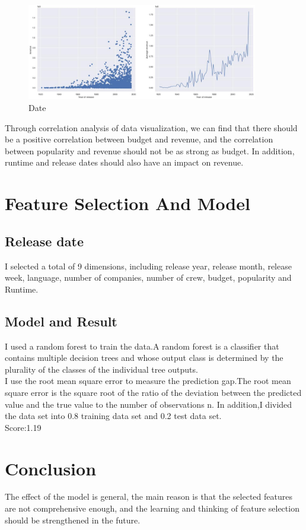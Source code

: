\begin{figure}[htbp]
  \includegraphics[width=0.9\textwidth,height=0.5\textwidth]{./figures/year2.eps}
  \caption{Date}
\end{figure}

Through correlation analysis of data visualization, we can find that there should be a positive correlation 
between budget and revenue, and the correlation between popularity and revenue should not be as strong as budget.
In addition, runtime and release dates should also have an impact on revenue.  \\


\section{Feature Selection And Model} \label{sec-preliminaries}
\subsection{Release date}
I selected a total of 9 dimensions, including release year, release month, release week, language, number of companies, 
number of crew, budget, popularity and Runtime.  \\

\subsection{Model and Result}
I used a random forest to train the data.A random forest is a classifier that contains multiple decision trees and whose output class is
determined by the plurality of the classes of the individual tree outputs.  \\
I use the root mean square error to measure the prediction gap.The root mean square error is the square root of the ratio of the deviation between the predicted
value and the true value to the number of observations n. In addition,I divided the data set into 0.8 training data set and 0.2 test data set. \\
Score:1.19 \\

\section{Conclusion} \label{sec-preliminaries}
The effect of the model is general, the main reason is that the selected features
are not comprehensive enough, and the learning and thinking of feature
selection should be strengthened in the future.